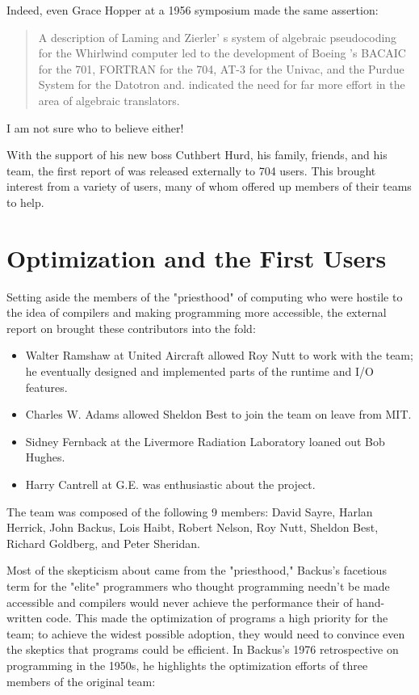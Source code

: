 Indeed, even Grace Hopper at a 1956 symposium made the same assertion:

\begin{quotation}
  A description of Laming and Zierler' s system of algebraic pseudocoding for
  the Whirlwind computer led to the development of Boeing 's BACAIC for the 701,
  FORTRAN for the 704, AT-3 for the Univac, and the Purdue System for the Datotron and. indicated the need for far more effort in the area of algebraic
  translators.
  \cite{Knuth_TrabbPardo_1976_Early_Development}
\end{quotation}

I am not sure who to believe either!

With the support of his new boss Cuthbert Hurd, his family, friends, and his
team, the first report of \FTN{} was released externally to 704 users. This
brought interest from a variety of users, many of whom offered up members of
their teams to help.

\section{\FTN{} Optimization and the First Users}

Setting aside the members of the "priesthood" of computing who were hostile to
the idea of compilers and making programming more accessible, the external
report on \FTN{} brought these contributors into the fold:
\begin{itemize}
  \item Walter Ramshaw at United Aircraft allowed Roy Nutt to work
    with the team; he
    eventually designed and implemented parts of the runtime and I/O features.
  \item Charles W. Adams allowed Sheldon Best to join the team on
    leave from MIT.
  \item Sidney Fernback at the Livermore Radiation Laboratory loaned
    out Bob Hughes.
  \item Harry Cantrell at G.E. was enthusiastic about the project.
\end{itemize}

The team was composed of the following 9 members: David Sayre, Harlan Herrick,
John Backus, Lois Haibt, Robert Nelson, Roy Nutt, Sheldon Best, Richard
Goldberg, and Peter Sheridan.

Most of the skepticism about \FTN{} came from the "priesthood," Backus's
facetious term for the "elite" programmers who thought programming needn't be
made accessible and compilers would never achieve the performance their of
hand-written code. This made the optimization of \FTN{} programs a high
priority for the team; to achieve the widest possible adoption, they would need
to convince even the skeptics that \FTN{} programs could be efficient. In
Backus's 1976 retrospective on programming in the
1950s\cite{Backus_1980_Programming_in_America_in_1950s}, he highlights the
optimization efforts of three members of the original team:

